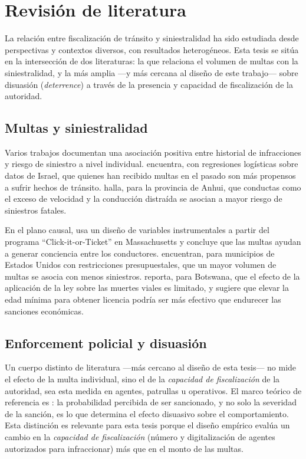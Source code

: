 \chapter{Revisión de literatura}
\label{chap:literatura}

\noindent
La relación entre fiscalización de tránsito y siniestralidad ha sido estudiada
desde perspectivas y contextos diversos, con resultados heterogéneos. Esta
tesis se sitúa en la intersección de dos literaturas: la que relaciona el
volumen de multas con la siniestralidad, y la más amplia —y más cercana al
diseño de este trabajo— sobre disuasión (\emph{deterrence}) a través de la
presencia y capacidad de fiscalización de la autoridad.

\section{Multas y siniestralidad}

Varios trabajos documentan una asociación positiva entre historial de
infracciones y riesgo de siniestro a nivel individual. \citet{factor2014}
encuentra, con regresiones logísticas sobre datos de Israel, que quienes han
recibido multas en el pasado son más propensos a sufrir hechos de tránsito.
\citet{huajing2022} halla, para la provincia de Anhui, que conductas como el
exceso de velocidad y la conducción distraída se asocian a mayor riesgo de
siniestros fatales.

En el plano causal, \citet{luca2015} usa un diseño de variables instrumentales a
partir del programa ``Click-it-or-Ticket'' en Massachusetts y concluye que las
multas ayudan a generar conciencia entre los conductores. \citet{makowsky2011}
encuentran, para municipios de Estados Unidos con restricciones
presupuestales, que un mayor volumen de multas se asocia con menos siniestros.
\citet{mphela2013} reporta, para Botswana, que el efecto de la aplicación de la
ley sobre las muertes viales es limitado, y sugiere que elevar la edad mínima
para obtener licencia podría ser más efectivo que endurecer las sanciones
económicas.

\section{Enforcement policial y disuasión}

Un cuerpo distinto de literatura —más cercano al diseño de esta tesis— no mide
el efecto de la multa individual, sino el de la \emph{capacidad de
fiscalización} de la autoridad, sea esta medida en agentes, patrullas u
operativos. El marco teórico de referencia es \citet{becker1968}: la
probabilidad percibida de ser sancionado, y no solo la severidad de la
sanción, es lo que determina el efecto disuasivo sobre el comportamiento. Esta
distinción es relevante para esta tesis porque el diseño empírico evalúa un
cambio en la \emph{capacidad de fiscalización} (número y digitalización de
agentes autorizados para infraccionar) más que en el monto de las multas.

